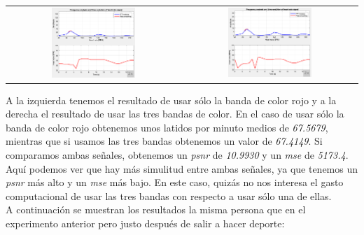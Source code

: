 \documentclass[11pt]{article}
\begin{document}
\begin{table}[H]
	\centering
	\begin{tabular}{cc}
		\includegraphics[width=0.5\textwidth]{images/sujeto3_R.png} & \includegraphics[width=0.5\textwidth]{images/sujeto3_RGB.png}
	\end{tabular}
\end{table}

A la izquierda tenemos el resultado de usar sólo la banda de color rojo y a la derecha el resultado de usar las tres bandas de color. En el caso de usar sólo la banda de color rojo obtenemos unos latidos por minuto medios de \textit{67.5679}, mientras que si usamos las tres bandas obtenemos un valor de \textit{67.4149}. Si comparamos ambas señales, obtenemos un \textit{psnr} de \textit{10.9930} y un \textit{mse} de \textit{5173.4}. Aquí podemos ver que hay más simulitud entre ambas señales, ya que tenemos un \textit{psnr} más alto y un \textit{mse} más bajo. En este caso, quizás no nos interesa el gasto computacional de usar las tres bandas con respecto a usar sólo una de ellas. \\

A continuación se muestran los resultados la misma persona que en el experimento anterior pero justo después de salir a hacer deporte:
\end{document}
